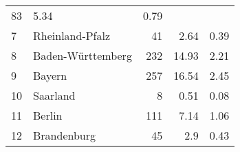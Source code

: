 \begin{longtable}{lXrrr}
       \num{83} &
       \num[round-mode=places,round-precision=2]{5.34} &
         \num[round-mode=places,round-precision=2]{0.79} \\

     7 &
     \multicolumn{1}{X}{ Rheinland-Pfalz   } &


       \num{41} &
       \num[round-mode=places,round-precision=2]{2.64} &
         \num[round-mode=places,round-precision=2]{0.39} \\

     8 &
     \multicolumn{1}{X}{ Baden-Württemberg   } &


       \num{232} &
       \num[round-mode=places,round-precision=2]{14.93} &
         \num[round-mode=places,round-precision=2]{2.21} \\

     9 &
     \multicolumn{1}{X}{ Bayern   } &


       \num{257} &
       \num[round-mode=places,round-precision=2]{16.54} &
         \num[round-mode=places,round-precision=2]{2.45} \\

     10 &
     \multicolumn{1}{X}{ Saarland   } &


       \num{8} &
       \num[round-mode=places,round-precision=2]{0.51} &
         \num[round-mode=places,round-precision=2]{0.08} \\

     11 &
     \multicolumn{1}{X}{ Berlin   } &


       \num{111} &
       \num[round-mode=places,round-precision=2]{7.14} &
         \num[round-mode=places,round-precision=2]{1.06} \\

     12 &
     \multicolumn{1}{X}{ Brandenburg   } &


       \num{45} &
       \num[round-mode=places,round-precision=2]{2.9} &
         \num[round-mode=places,round-precision=2]{0.43} \\


\end{longtable}
